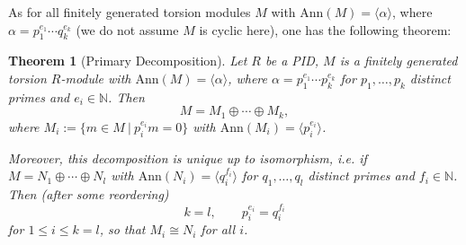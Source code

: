 \documentclass[11pt,openany]{book}
\theoremstyle{plain}
\newtheorem{theorem}{Theorem}[chapter]
\theoremstyle{definition}
\theoremstyle{remark}
\begin{document}
As for all finitely generated torsion modules $M$ with $\mathrm{Ann}(M)=\langle\alpha\rangle$, where $\alpha=p_1^{e_1}\cdots q_k^{e_k}$
(we do not assume $M$ is cyclic here), one has the following theorem:

\begin{theorem} [Primary Decomposition] \label{thm-primarydecomp}
    Let $R$ be a PID, $M$ is a finitely generated torsion $R$-module with $\mathrm{Ann}(M)=\langle\alpha\rangle$, where $\alpha=p_1^{e_1}\cdots p_k^{e_k}$ for $p_1, \dots, p_k$ distinct primes and $e_i \in \mathbb{N}$. Then
    $$M=M_1\oplus\cdots\oplus M_k,$$
    where $M_i:=\{m\in M\ |\ p_i^{e_i}m=0\}$ with $\mathrm{Ann}(M_i)=\langle p_i^{e_i}\rangle$.
    
    Moreover, this decomposition is unique up to isomorphism, i.e. if $M=N_1\oplus\cdots\oplus N_l$ with $\mathrm{Ann}(N_i)=\langle q_i^{f_i}\rangle$ for $q_1, \dots, q_l$ distinct primes and $f_i \in \mathbb{N}$. Then (after some reordering)
    $$k=l,\quad\quad p_i^{e_i}=q_i^{f_i}$$
    for $1\leq i\leq k = l$, so that $M_i\cong N_i$ for all $i$.
\end{theorem}
\end{document}
